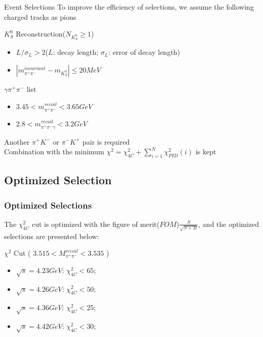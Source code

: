 \documentclass{beamer}
\begin{document}
\begin{frame}{Event Selections}
To improve the efficiency of selections, we assume the following charged tracks as pions
\bigskip
\begin{block}{$K^0_S$ Reconstruction($N_{K^0_S} \geq 1$)}
\begin{itemize}
\item $L/\sigma_L > 2$\hspace($L$: decay length; $\sigma_L$: error of decay length)
\item $|m^{invariant}_{\pi^+\pi^-} - m_{K^0_S} | \leq 20 MeV$
\end{itemize}
\end{block}
\begin{block}{$\gamma\pi^+\pi^-$ list}
\begin{itemize}
\item $3.45<m_{\pi^+\pi^-}^{recoil}<3.65 GeV$
\item $2.8<m_{\pi^+\pi^-\gamma}^{recoil}<3.2 GeV$
\end{itemize}
\end{block}
        Another $\pi^+K^-$ or $\pi^-K^+$ pair is required\\
Combination with the minimum $\chi^2 = \chi^2_{4C} + \sum^N_{i=1}\chi^2_{PID}(i)$ is kept 
\end{frame}

\subsection{Optimized Selection} %

\begin{frame}
\frametitle{Optimized Selections}
The $\chi^2_{4C}$ cut is optimized with the figure of merit($FOM$)$\frac{S}{\sqrt{S+B}}$,
and the optimized selections are presented below:
\bigskip
\begin{block}{$\chi^2$ Cut  ( $3.515 < M^{recoil}_{\pi^+\pi^-} < 3.535$ )}
\begin{itemize}
\item $\sqrt{s} = 4.23 GeV$: $\chi^2_{4C} < 65$;
\item $\sqrt{s} = 4.26 GeV$: $\chi^2_{4C} < 50$;
\item $\sqrt{s} = 4.36 GeV$: $\chi^2_{4C} < 25$;
\item $\sqrt{s} = 4.42 GeV$: $\chi^2_{4C} < 30$;
\end{itemize}
\end{block}
\end{frame}
\end{document}
